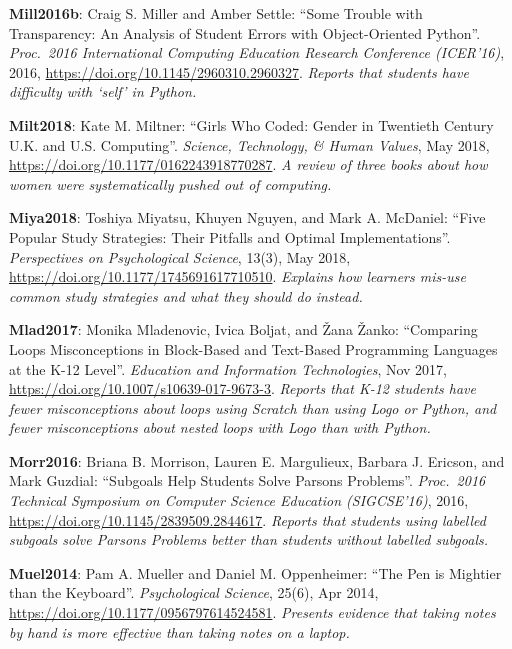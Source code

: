 \textbf{\hypertarget{b:Mill2016b}{Mill2016b}\label{b:Mill2016b}}: Craig S. Miller and Amber Settle: ``Some Trouble with Transparency: An Analysis of Student Errors with Object-Oriented Python''. \emph{Proc.\ 2016 International Computing Education Research Conference (ICER'16)}, 2016, \url{https://doi.org/10.1145/2960310.2960327}. \emph{Reports that students have difficulty with `self' in Python.}

\textbf{\hypertarget{b:Milt2018}{Milt2018}\label{b:Milt2018}}: Kate M. Miltner: ``Girls Who Coded: Gender in Twentieth Century U.K. and U.S. Computing''. \emph{Science, Technology, \& Human Values}, May 2018, \url{https://doi.org/10.1177/0162243918770287}. \emph{A review of three books about how women were systematically pushed out of computing.}

\textbf{\hypertarget{b:Miya2018}{Miya2018}\label{b:Miya2018}}: Toshiya Miyatsu, Khuyen Nguyen, and Mark A. McDaniel: ``Five Popular Study Strategies: Their Pitfalls and Optimal Implementations''. \emph{Perspectives on Psychological Science}, 13(3), May 2018, \url{https://doi.org/10.1177/1745691617710510}. \emph{Explains how learners mis-use common study strategies and what they should do instead.}

\textbf{\hypertarget{b:Mlad2017}{Mlad2017}\label{b:Mlad2017}}: Monika Mladenovic, Ivica Boljat, and Žana Žanko: ``Comparing Loops Misconceptions in Block-Based and Text-Based Programming Languages at the K-12 Level''. \emph{Education and Information Technologies}, Nov 2017, \url{https://doi.org/10.1007/s10639-017-9673-3}. \emph{Reports that K-12 students have fewer misconceptions about loops using Scratch than using Logo or Python, and fewer misconceptions about nested loops with Logo than with Python.}

\textbf{\hypertarget{b:Morr2016}{Morr2016}\label{b:Morr2016}}: Briana B. Morrison, Lauren E. Margulieux, Barbara J. Ericson, and Mark Guzdial: ``Subgoals Help Students Solve Parsons Problems''. \emph{Proc.\ 2016 Technical Symposium on Computer Science Education (SIGCSE'16)}, 2016, \url{https://doi.org/10.1145/2839509.2844617}. \emph{Reports that students using labelled subgoals solve Parsons Problems better than students without labelled subgoals.}

\textbf{\hypertarget{b:Muel2014}{Muel2014}\label{b:Muel2014}}: Pam A. Mueller and Daniel M. Oppenheimer: ``The Pen is Mightier than the Keyboard''. \emph{Psychological Science}, 25(6), Apr 2014, \url{https://doi.org/10.1177/0956797614524581}. \emph{Presents evidence that taking notes by hand is more effective than taking notes on a laptop.}

